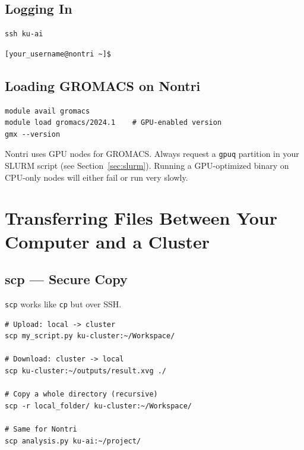 \documentclass[12pt,a4paper]{article}
\newcommand{\warn}[1]{%
  \begin{tcolorbox}[warnstyle]
    #1
  \end{tcolorbox}
}
\newcommand{\cmd}[1]{\texttt{\textcolor{kugreen!70!black}{#1}}}
\begin{document}
\subsection{Logging In}

\begin{lstlisting}[style=bash]
ssh ku-ai
\end{lstlisting}

\begin{lstlisting}[style=terminal]
[your_username@nontri ~]$
\end{lstlisting}

\subsection{Loading GROMACS on Nontri}

\begin{lstlisting}[style=bash]
module avail gromacs
module load gromacs/2024.1    # GPU-enabled version
gmx --version
\end{lstlisting}

\warn{
  Nontri uses GPU nodes for GROMACS. Always request a \texttt{gpuq} partition
  in your SLURM script (see Section~\ref{sec:slurm}). Running a
  GPU-optimized binary on CPU-only nodes will either fail or run very slowly.
}

\section{Transferring Files Between Your Computer and a Cluster}

\subsection{scp --- Secure Copy}

\cmd{scp} works like \cmd{cp} but over SSH.

\begin{lstlisting}[style=bash]
# Upload: local -> cluster
scp my_script.py ku-cluster:~/Workspace/

# Download: cluster -> local
scp ku-cluster:~/outputs/result.xvg ./

# Copy a whole directory (recursive)
scp -r local_folder/ ku-cluster:~/Workspace/

# Same for Nontri
scp analysis.py ku-ai:~/project/
\end{lstlisting}
\end{document}
